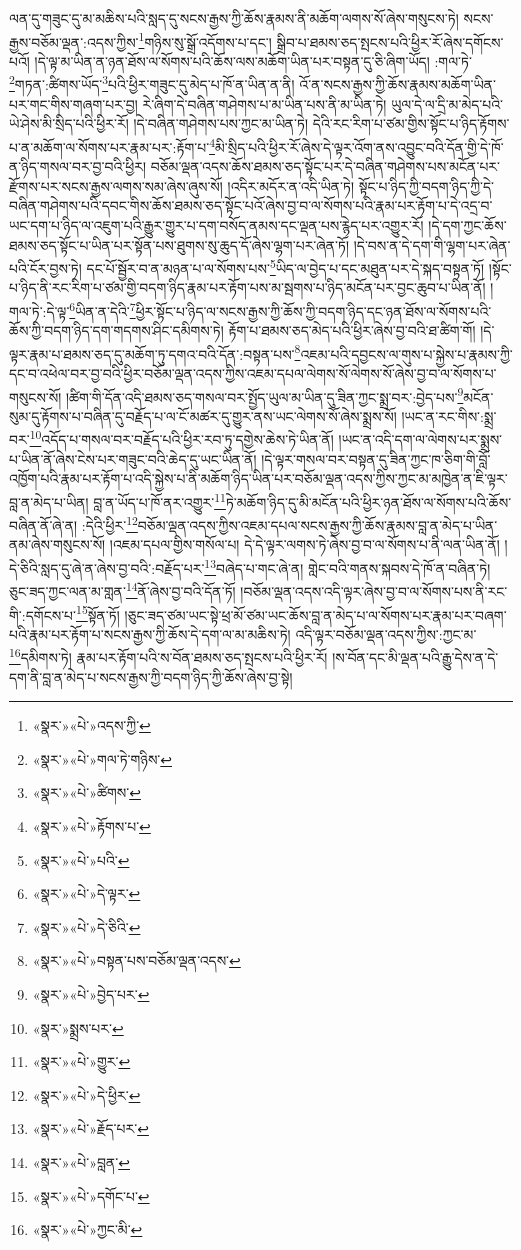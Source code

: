 ལན་དུ་གཟུང་དུ་མ་མཆིས་པའི་སླད་དུ་སངས་རྒྱས་ཀྱི་ཆོས་རྣམས་ནི་མཆོག་ལགས་སོ་ཞེས་གསུངས་ཏེ། སངས་རྒྱས་བཅོམ་ལྡན་:འདས་ཀྱིས་\footnote{«སྣར་»«པེ་»འདས་ཀྱི་}གཉིས་སུ་སྒྲོ་འདོགས་པ་དང་། སྒྲིབ་པ་ཐམས་ཅད་སྤངས་པའི་ཕྱིར་རོ་ཞེས་དགོངས་པའོ། །དེ་ལྟ་མ་ཡིན་ན་ཉན་ཐོས་ལ་སོགས་པའི་ཆོས་ལས་མཆོག་ཡིན་པར་བསྟན་དུ་ཅི་ཞིག་ཡོད། :གལ་ཏེ་\footnote{«སྣར་»«པེ་»གལ་ཏེ་གཉིས་}གཏན་:ཚིགས་ཡོད་\footnote{«སྣར་»«པེ་»ཚིགས་}པའི་ཕྱིར་གཟུང་དུ་མེད་པ་ཁོ་ན་ཡིན་ན་ནི། འོ་ན་སངས་རྒྱས་ཀྱི་ཆོས་རྣམས་མཆོག་ཡིན་པར་གང་གིས་གཞག་པར་བྱ། རེ་ཞིག་དེ་བཞིན་གཤེགས་པ་མ་ཡིན་པས་ནི་མ་ཡིན་ཏེ། ཡུལ་དེ་ལ་དྲི་མ་མེད་པའི་ཡེ་ཤེས་མི་སྲིད་པའི་ཕྱིར་རོ། །དེ་བཞིན་གཤེགས་པས་ཀྱང་མ་ཡིན་ཏེ། དེའི་རང་རིག་པ་ཙམ་གྱིས་སྟོང་པ་ཉིད་རྟོགས་པ་ན་མཆོག་ལ་སོགས་པར་རྣམ་པར་:རྟོག་པ་\footnote{«སྣར་»«པེ་»རྟོགས་པ་}མི་སྲིད་པའི་ཕྱིར་རོ་ཞེས་དེ་ལྟར་འོག་ནས་འབྱུང་བའི་དོན་གྱི་དེ་ཁོ་ན་ཉིད་གསལ་བར་བྱ་བའི་ཕྱིར། བཅོམ་ལྡན་འདས་ཆོས་ཐམས་ཅད་སྟོང་པར་དེ་བཞིན་གཤེགས་པས་མངོན་པར་རྫོགས་པར་སངས་རྒྱས་ལགས་སམ་ཞེས་ཞུས་སོ། །འདིར་མདོར་ན་འདི་ཡིན་ཏེ། སྟོང་པ་ཉིད་ཀྱི་བདག་ཉིད་ཀྱི་དེ་བཞིན་གཤེགས་པའི་དབང་གིས་ཆོས་ཐམས་ཅད་སྟོང་པའོ་ཞེས་བྱ་བ་ལ་སོགས་པའི་རྣམ་པར་རྟོག་པ་དེ་འདྲ་བ་ཡང་དག་པ་ཉིད་ལ་འཇུག་པའི་རྒྱུར་གྱུར་པ་དག་བསོད་ནམས་དང་ལྡན་པས་རྙེད་པར་འགྱུར་རོ། །དེ་དག་ཀྱང་ཆོས་ཐམས་ཅད་སྟོང་པ་ཡིན་པར་སྟོན་པས་ཐུགས་སུ་ཆུད་དོ་ཞེས་ལྷག་པར་ཞེན་ཏོ། །དེ་བས་ན་དེ་དག་གི་ལྷག་པར་ཞེན་པའི་ངོར་བྱས་ཏེ། དང་པོ་སྦྱོར་བ་ན་མཉན་པ་ལ་སོགས་པས་\footnote{«སྣར་»«པེ་»པའི་}ཡིད་ལ་བྱེད་པ་དང་མཐུན་པར་དེ་སྐད་བསྟན་ཏོ། །སྟོང་པ་ཉིད་ནི་རང་རིག་པ་ཙམ་གྱི་བདག་ཉིད་རྣམ་པར་རྟོག་པས་མ་སྦགས་པ་ཉིད་མངོན་པར་བྱང་ཆུབ་པ་ཡིན་ནོ། །གལ་ཏེ་:དེ་ལྟ་\footnote{«སྣར་»«པེ་»དེ་ལྟར་}ཡིན་ན་དེའི་\footnote{«སྣར་»«པེ་»དེ་ཅིའི་}ཕྱིར་སྟོང་པ་ཉིད་ལ་སངས་རྒྱས་ཀྱི་ཆོས་ཀྱི་བདག་ཉིད་དང་ཉན་ཐོས་ལ་སོགས་པའི་ཆོས་ཀྱི་བདག་ཉིད་དག་གདགས་ཤིང་དམིགས་ཏེ། རྟོག་པ་ཐམས་ཅད་མེད་པའི་ཕྱིར་ཞེས་བྱ་བའི་ཐ་ཚིག་གོ། །དེ་ལྟར་རྣམ་པ་ཐམས་ཅད་དུ་མཆོག་ཏུ་དགའ་བའི་དོན་:བསྟན་པས་\footnote{«སྣར་»«པེ་»བསྟན་པས་བཅོམ་ལྡན་འདས་}འཇམ་པའི་དབྱངས་ལ་གུས་པ་སྐྱེས་པ་རྣམས་ཀྱི་དང་བ་འཕེལ་བར་བྱ་བའི་ཕྱིར་བཅོམ་ལྡན་འདས་ཀྱིས་འཇམ་དཔལ་ལེགས་སོ་ལེགས་སོ་ཞེས་བྱ་བ་ལ་སོགས་པ་གསུངས་སོ། །ཚིག་གི་དོན་འདི་ཐམས་ཅད་གསལ་བར་སྤྱོད་ཡུལ་མ་ཡིན་དུ་ཟིན་ཀྱང་སྨྲ་བར་:བྱེད་པས་\footnote{«སྣར་»«པེ་»བྱེད་པར་}མངོན་སུམ་དུ་རྟོགས་པ་བཞིན་དུ་བརྗོད་པ་ལ་ངོ་མཚར་དུ་གྱུར་ནས་ཡང་ལེགས་སོ་ཞེས་སྨྲས་སོ། །ཡང་ན་རང་གིས་:སྨྲ་བར་\footnote{«སྣར་»སྨྲས་པར་}འདོད་པ་གསལ་བར་བརྗོད་པའི་ཕྱིར་རབ་ཏུ་དགྱེས་ཆེས་ཏེ་ཡིན་ནོ། །ཡང་ན་འདི་དག་ལ་ལེགས་པར་སྨྲས་པ་ཡིན་ནོ་ཞེས་ངེས་པར་གཟུང་བའི་ཆེད་དུ་ཡང་ཡིན་ནོ། །དེ་ལྟར་གསལ་བར་བསྟན་དུ་ཟིན་ཀྱང་ཁ་ཅིག་གི་བློ་འཁྱོག་པའི་རྣམ་པར་རྟོག་པ་འདི་སྐྱེས་པ་ནི་མཆོག་ཉིད་ཡིན་པར་བཅོམ་ལྡན་འདས་ཀྱིས་ཀྱང་མ་མཁྱེན་ན་ཇི་ལྟར་བླ་ན་མེད་པ་ཡིན། བླ་ན་ཡོད་པ་ཁོ་ནར་འགྱུར་\footnote{«སྣར་»«པེ་»གྱུར་}ཏེ་མཆོག་ཉིད་དུ་མི་མངོན་པའི་ཕྱིར་ཉན་ཐོས་ལ་སོགས་པའི་ཆོས་བཞིན་ནོ་ཞེ་ན། :དེའི་ཕྱིར་\footnote{«སྣར་»«པེ་»དེ་ཕྱིར་}བཅོམ་ལྡན་འདས་ཀྱིས་འཇམ་དཔལ་སངས་རྒྱས་ཀྱི་ཆོས་རྣམས་བླ་ན་མེད་པ་ཡིན་ནམ་ཞེས་གསུངས་སོ། །འཇམ་དཔལ་གྱིས་གསོལ་པ། དེ་དེ་ལྟར་ལགས་ཏེ་ཞེས་བྱ་བ་ལ་སོགས་པ་ནི་ལན་ཡིན་ནོ། །དེ་ཅིའི་སླད་དུ་ཞེ་ན་ཞེས་བྱ་བའི་:བརྗོད་པར་\footnote{«སྣར་»«པེ་»རྗོད་པར་}བཞེད་པ་གང་ཞེ་ན། གླེང་བའི་གནས་སྐབས་དེ་ཁོ་ན་བཞིན་ཏེ། ཅུང་ཟད་ཀྱང་ལན་མ་གླན་\footnote{«སྣར་»«པེ་»བླན་}ནོ་ཞེས་བྱ་བའི་དོན་ཏོ། །བཅོམ་ལྡན་འདས་འདི་ལྟར་ཞེས་བྱ་བ་ལ་སོགས་པས་ནི་རང་གི་:དགོངས་པ་\footnote{«སྣར་»«པེ་»དགོང་པ་}སྟོན་ཏོ། །ཅུང་ཟད་ཙམ་ཡང་སྟེ་ཕྲ་མོ་ཙམ་ཡང་ཆོས་བླ་ན་མེད་པ་ལ་སོགས་པར་རྣམ་པར་བཞག་པའི་རྣམ་པར་རྟོག་པ་སངས་རྒྱས་ཀྱི་ཆོས་དེ་དག་ལ་མ་མཆིས་ཏེ། འདི་ལྟར་བཅོམ་ལྡན་འདས་ཀྱིས་:ཀྱང་མ་\footnote{«སྣར་»«པེ་»ཀྱང་མི་}དམིགས་ཏེ། རྣམ་པར་རྟོག་པའི་ས་བོན་ཐམས་ཅད་སྤངས་པའི་ཕྱིར་རོ། །ས་བོན་དང་མི་ལྡན་པའི་རྒྱུ་དེས་ན་དེ་དག་ནི་བླ་ན་མེད་པ་སངས་རྒྱས་ཀྱི་བདག་ཉིད་ཀྱི་ཆོས་ཞེས་བྱ་སྟེ། 